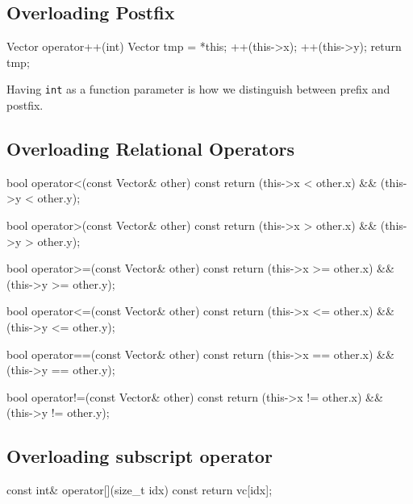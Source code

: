 \documentclass{report}
\begin{document}
    \bigbreak \noindent 
    \subsection{Overloading Postfix}
    \bigbreak \noindent 
    \begin{cppcode}
    Vector operator++(int) {
            Vector tmp = *this;
            ++(this->x);
            ++(this->y);
            return  tmp;
    }
    \end{cppcode}
    \bigbreak \noindent 
    \begin{notebox}
        Having \texttt{int} as a function parameter is how we distinguish  between prefix and postfix.
    \end{notebox}

    \pagebreak \bigbreak \noindent 
    \subsection{Overloading Relational Operators}
    \bigbreak \noindent 
    \begin{cppcode}
    bool operator<(const Vector& other) const {
        return (this->x < other.x) && (this->y < other.y);
    }

    bool operator>(const Vector& other) const {
        return (this->x > other.x) && (this->y > other.y);
    }

    bool operator>=(const Vector& other) const {
        return (this->x >= other.x) && (this->y >= other.y);
    }

    bool operator<=(const Vector& other) const {
        return (this->x <= other.x) && (this->y <= other.y);
    }

    bool operator==(const Vector& other) const {
        return (this->x == other.x) && (this->y == other.y);
    }

    bool operator!=(const Vector& other) const {
        return (this->x != other.x) && (this->y != other.y);
    }
    \end{cppcode}

    \bigbreak \noindent 
    \subsection{Overloading subscript operator}
    \bigbreak \noindent 
    \begin{cppcode}
    const int& operator[](size_t idx) const {
        return vc[idx];
    }
    \end{cppcode}
\end{document}
